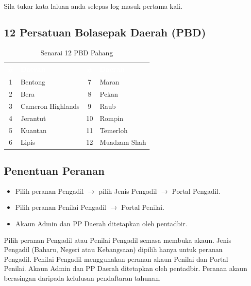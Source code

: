 \documentclass[12pt,a4paper]{report}
\begin{document}
\begin{importantbox}
Sila tukar kata laluan anda selepas log masuk pertama kali.
\end{importantbox}

\subsection{12 Persatuan Bolasepak Daerah (PBD)}

\begin{table}[H]
\centering
{}
\begin{tabularx}{\textwidth}{c l c l}
\toprule
\rowcolor{tableheader}
\textcolor{white}{\textbf{\#}} & \textcolor{white}{\textbf{Daerah}} & \textcolor{white}{\textbf{\#}} & \textcolor{white}{\textbf{Daerah}} \\
\midrule
1 & Bentong & 7 & Maran \\
2 & Bera & 8 & Pekan \\
3 & Cameron Highlands & 9 & Raub \\
4 & Jerantut & 10 & Rompin \\
5 & Kuantan & 11 & Temerloh \\
6 & Lipis & 12 & Muadzam Shah \\
\bottomrule
\end{tabularx}
\caption{Senarai 12 PBD Pahang}
\end{table}

\subsection{Penentuan Peranan}

\begin{itemize}[label=\textcolor{pbnpblue}{\faChevronRight}]
  \item Pilih peranan Pengadil $\rightarrow$ pilih Jenis Pengadil $\rightarrow$ Portal Pengadil.
  \item Pilih peranan Penilai Pengadil $\rightarrow$ Portal Penilai.
  \item Akaun Admin dan PP Daerah ditetapkan oleh pentadbir.
\end{itemize}

\begin{infobox}
Pilih peranan Pengadil atau Penilai Pengadil semasa membuka akaun. Jenis Pengadil (Baharu, Negeri atau Kebangsaan) dipilih hanya untuk peranan Pengadil. Penilai Pengadil menggunakan peranan akaun Penilai dan Portal Penilai. Akaun Admin dan PP Daerah ditetapkan oleh pentadbir. Peranan akaun berasingan daripada kelulusan pendaftaran tahunan.
\end{infobox}
\end{document}

